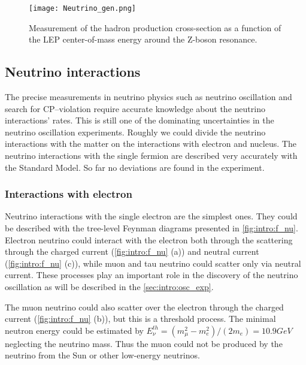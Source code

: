 \documentclass[../main.tex]{subfiles}
\begin{document}
\begin{figure}[!ht]
    \centering
    \texttt{[image: Neutrino\_gen.png]}
    \caption{Measurement of the hadron production cross-section as a function of the LEP center-of-mass energy around the Z-boson resonance.}
    \label{fig:intro:NuGen}
\end{figure}

\subsection{Neutrino interactions}
The precise measurements in neutrino physics such as neutrino oscillation and search for CP--violation require accurate knowledge about the neutrino interactions' rates. This is still one of the dominating uncertainties in the neutrino oscillation experiments. Roughly we could divide the neutrino interactions with the matter on the interactions with electron and nucleus. The neutrino interactions with the single fermion are described very accurately with the Standard Model. So far no deviations are found in the experiment.

\subsubsection{Interactions with electron}
Neutrino interactions with the single electron are the simplest ones. They could be described with the tree-level Feynman diagrams presented in \autoref{fig:intro:f_nu}. Electron neutrino could interact with the electron both through the scattering through the charged current (\autoref{fig:intro:f_nu} (a)) and neutral current (\autoref{fig:intro:f_nu} (c)), while muon and tau neutrino could scatter only via neutral current. These processes play an important role in the discovery of the neutrino oscillation as will be described in the \autoref{sec:intro:osc_exp}.

The muon neutrino could also scatter over the electron through the charged current (\autoref{fig:intro:f_nu} (b)), but this is a threshold process. The minimal neutron energy could be estimated by $E_\nu^{th}=\left(m_\mu^2-m_e^2\right)/\left(2m_e\right)=10.9GeV$ neglecting the neutrino mass. Thus the muon could not be produced by the neutrino from the Sun or other low-energy neutrinos.
\end{document}

